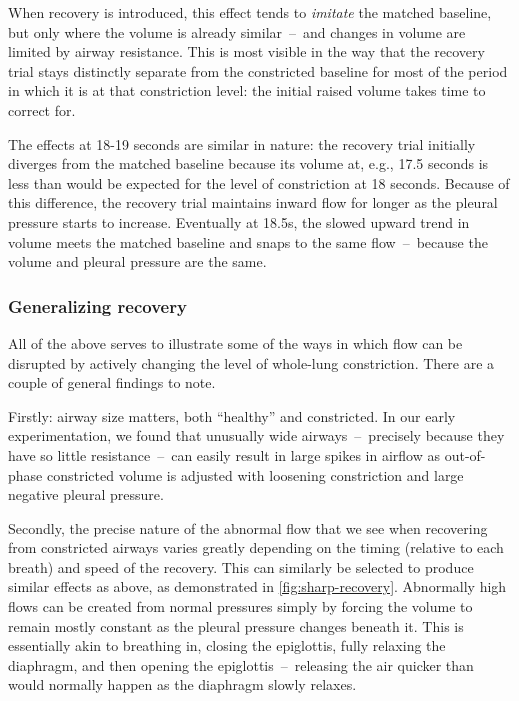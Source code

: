 When recovery is introduced, this effect tends to \textit{imitate} the matched baseline, but only
where the volume is already similar~--~and changes in volume are limited by airway resistance. This
is most visible in the way that the recovery trial stays distinctly separate from the constricted
baseline for most of the period in which it is at that constriction level: the initial raised volume
takes time to correct for.

The effects at 18-19 seconds are similar in nature: the recovery trial initially diverges from the
matched baseline because its volume at, e.g., 17.5 seconds is less than would be expected for the
level of constriction at 18 seconds. Because of this difference, the recovery trial maintains inward
flow for longer as the pleural pressure starts to increase. Eventually at 18.5s, the slowed upward
trend in volume meets the matched baseline and snaps to the same flow~--~because the volume and
pleural pressure are the same.

\subsubsection{Generalizing recovery}

All of the above serves to illustrate some of the ways in which flow can be disrupted by actively
changing the level of whole-lung constriction. There are a couple of general findings to note.

Firstly: airway size matters, both ``healthy'' and constricted. In our early experimentation, we
found that unusually wide airways~--~precisely because they have so little resistance~--~can easily
result in large spikes in airflow as out-of-phase constricted volume is adjusted with loosening
constriction and large negative pleural pressure.

Secondly, the precise nature of the abnormal flow that we see when recovering from constricted
airways varies greatly depending on the timing (relative to each breath) and speed of the recovery.
This can similarly be selected to produce similar effects as above, as demonstrated in
\autoref{fig:sharp-recovery}. Abnormally high flows can be created from normal pressures simply by
forcing the volume to remain mostly constant as the pleural pressure changes beneath it. This is
essentially akin to breathing in, closing the epiglottis, fully relaxing the diaphragm, and then
opening the epiglottis~--~releasing the air quicker than would normally happen as the diaphragm
slowly relaxes.\footnotemark

